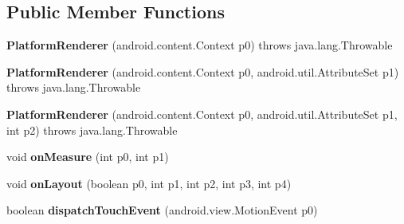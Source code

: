 \subsection*{Public Member Functions}
\begin{DoxyCompactItemize}
\item 
\hypertarget{classmd5282f1122c1313907b9bf274dd2c2f344_1_1PlatformRenderer_ab2853a62127e229e0b49a9989dd9f73d}{}{\bfseries Platform\+Renderer} (android.\+content.\+Context p0)  throws java.\+lang.\+Throwable 	\label{classmd5282f1122c1313907b9bf274dd2c2f344_1_1PlatformRenderer_ab2853a62127e229e0b49a9989dd9f73d}

\item 
\hypertarget{classmd5282f1122c1313907b9bf274dd2c2f344_1_1PlatformRenderer_ab2275781b78fa5ed215b9d6d70ed14da}{}{\bfseries Platform\+Renderer} (android.\+content.\+Context p0, android.\+util.\+Attribute\+Set p1)  throws java.\+lang.\+Throwable 	\label{classmd5282f1122c1313907b9bf274dd2c2f344_1_1PlatformRenderer_ab2275781b78fa5ed215b9d6d70ed14da}

\item 
\hypertarget{classmd5282f1122c1313907b9bf274dd2c2f344_1_1PlatformRenderer_a3b915de4274c64570cc45c6e2142be89}{}{\bfseries Platform\+Renderer} (android.\+content.\+Context p0, android.\+util.\+Attribute\+Set p1, int p2)  throws java.\+lang.\+Throwable 	\label{classmd5282f1122c1313907b9bf274dd2c2f344_1_1PlatformRenderer_a3b915de4274c64570cc45c6e2142be89}

\item 
\hypertarget{classmd5282f1122c1313907b9bf274dd2c2f344_1_1PlatformRenderer_a527121b22fd286dd463f34c531498728}{}void {\bfseries on\+Measure} (int p0, int p1)\label{classmd5282f1122c1313907b9bf274dd2c2f344_1_1PlatformRenderer_a527121b22fd286dd463f34c531498728}

\item 
\hypertarget{classmd5282f1122c1313907b9bf274dd2c2f344_1_1PlatformRenderer_a276fb5facc8841784daf3e21bbe3c407}{}void {\bfseries on\+Layout} (boolean p0, int p1, int p2, int p3, int p4)\label{classmd5282f1122c1313907b9bf274dd2c2f344_1_1PlatformRenderer_a276fb5facc8841784daf3e21bbe3c407}

\item 
\hypertarget{classmd5282f1122c1313907b9bf274dd2c2f344_1_1PlatformRenderer_a359850166bb559d64da07b3f852e116a}{}boolean {\bfseries dispatch\+Touch\+Event} (android.\+view.\+Motion\+Event p0)\label{classmd5282f1122c1313907b9bf274dd2c2f344_1_1PlatformRenderer_a359850166bb559d64da07b3f852e116a}


\end{DoxyCompactItemize}
